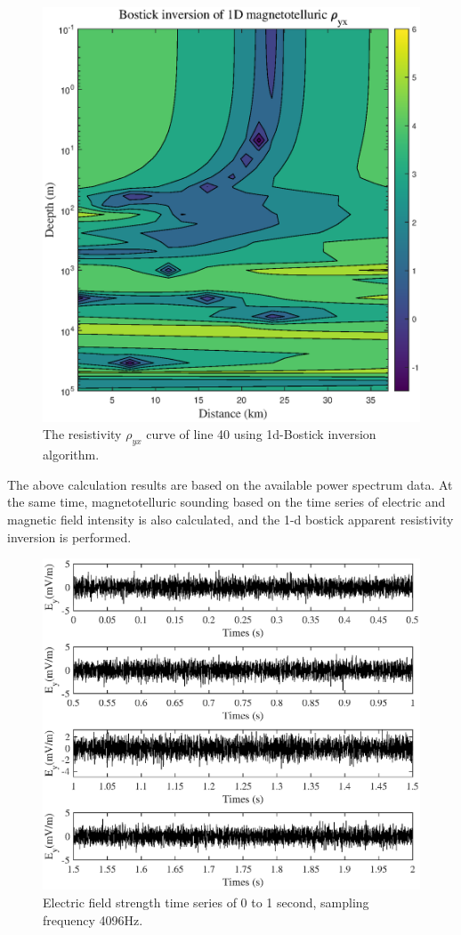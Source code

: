 \documentclass[9pt,a4paper,twoside]{rho-class/rho}
\begin{document}
\begin{figure}[H]
    \centering
    \includegraphics[width=0.95\columnwidth]{figures/Bostick1dryx.eps}
    \caption{The resistivity $\rho_{yx}$ curve of line 40 using 1d-Bostick inversion algorithm.}
    \label{fig:bostick2}
\end{figure}

The above calculation results are based on the available power spectrum data. At the same time, magnetotelluric sounding based on the time series of electric and magnetic field intensity is also calculated, and the 1-d bostick apparent resistivity inversion is performed.

\begin{figure}[htbp]
    \centering
    \includegraphics[width=0.95\columnwidth]{figures/et.eps}
    \caption{Electric field strength time series of 0 to 1 second, sampling frequency 4096Hz.}
    \label{fig:et}
\end{figure}
\end{document}
